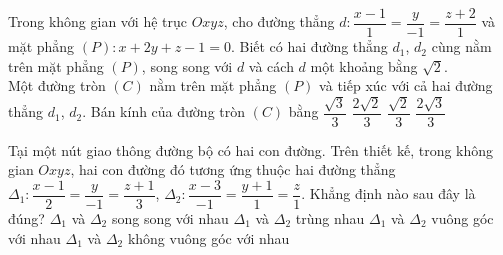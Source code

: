 \begin{ex}%
	Trong không gian với hệ trục $Oxyz$, cho đường thẳng $d\colon \dfrac{x - 1}{1} = \dfrac{y}{-1} = \dfrac{z + 2}{1}$ và mặt phẳng $(P)\colon x + 2y + z - 1 = 0$. Biết có hai đường thẳng $d_1$, $d_2$ cùng nằm trên mặt phẳng $(P)$, song song với $d$ và cách $d$ một khoảng  bằng $\sqrt{2}$.\\
	Một đường tròn $(C)$ nằm trên mặt phẳng $(P)$ và  tiếp xúc với cả hai đường thẳng $d_1$, $d_2$. Bán kính của đường tròn $(C)$ bằng
	\choice 
		{\True  $\dfrac{\sqrt{3}}{3}$}
		 {$\dfrac{2\sqrt{2}}{3}$}
		 {$\dfrac{\sqrt{2}}{3}$}
		 {$\dfrac{2\sqrt{3}}{3}$}
\end{ex}

\begin{ex}%
	Tại một nút giao thông đường bộ có hai con đường. Trên thiết kế, trong không gian $Oxyz$, hai con đường đó tương ứng thuộc hai đường thẳng $\Delta_1\colon  \dfrac{x - 1}{2} = \dfrac{y}{-1} = \dfrac{z + 1}{3}$, $\Delta_2\colon \dfrac{x - 3}{-1} = \dfrac{y + 1}{1} = \dfrac{z}{1}$.
	Khẳng  định nào sau đây là đúng?
	\choice 
		 {$\Delta_1$ và $\Delta_2$ song song với nhau}
		{$\Delta_1$ và $\Delta_2$  trùng nhau}
		{\True $\Delta_1$  và $\Delta_2$ vuông góc với nhau}
		{$\Delta_1$ và $\Delta_2$ không vuông góc với  nhau}
\end{ex}

